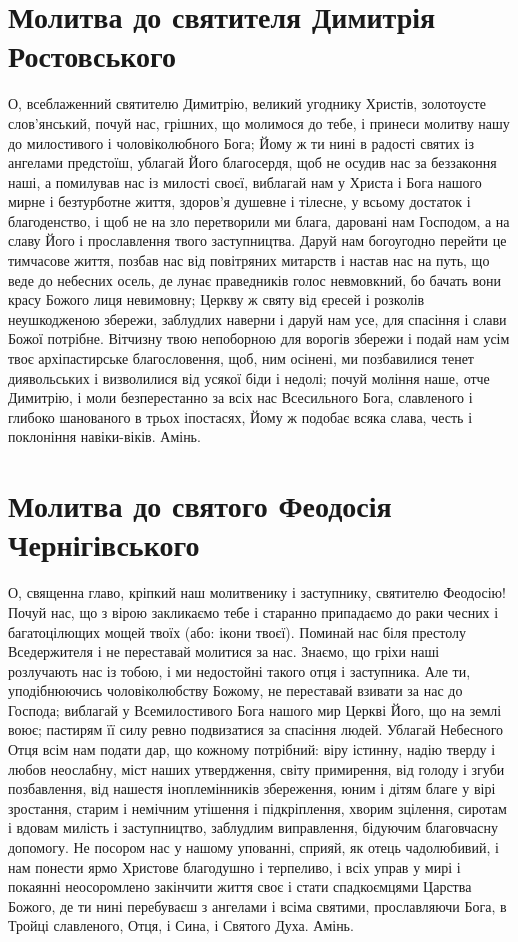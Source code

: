 \documentclass[chapters.tex]{subfiles}
\begin{document}
\section{Молитва до святителя Димитрія Ростовського}
О, всеблаженний святителю Димитрію, великий угоднику Христів, золотоусте слов’янський, почуй нас, грішних, що молимося до тебе, і принеси молитву нашу до милостивого і чоловіколюбного Бога; Йому ж ти нині в радості святих із ангелами предстоїш, ублагай Його благосердя, щоб не осудив нас за беззаконня наші, а помилував нас із милості своєї, виблагай нам у Христа і Бога нашого мирне і безтурботне життя, здоров’я душевне і тілесне, у всьому достаток і благоденство, і щоб не на зло перетворили ми блага, даровані нам Господом, а на славу Його і прославлення твого заступництва. Даруй нам богоугодно перейти це тимчасове життя, позбав нас від повітряних митарств і настав нас на путь, що веде до небесних осель, де лунає праведників голос невмовкний, бо бачать вони красу Божого лиця невимовну; Церкву ж святу від єресей і розколів неушкодженою збережи, заблудлих наверни і даруй нам усе, для спасіння і слави Божої потрібне. Вітчизну твою непоборною для ворогів збережи і подай нам усім твоє архіпастирське благословення, щоб, ним осінені, ми позбавилися тенет диявольських і визволилися від усякої біди і недолі; почуй моління наше, отче Димитрію, і моли безперестанно за всіх нас Всесильного Бога, славленого і глибоко шанованого в трьох іпостасях, Йому ж подобає всяка слава, честь і поклоніння навіки-віків. Амінь.

\section{Молитва до святого Феодосія Чернігівського}
О, священна главо, кріпкий наш молитвенику і заступнику, святителю Феодосію! Почуй нас, що з вірою закликаємо тебе і старанно припадаємо до раки чесних і багатоцілющих мощей твоїх (або: ікони твоєї). Поминай нас біля престолу Вседержителя і не переставай молитися за нас. Знаємо, що гріхи наші розлучають нас із тобою, і ми недостойні такого отця і заступника. Але ти, уподібнюючись чоловіколюбству Божому, не переставай взивати за нас до Господа; виблагай у Всемилостивого Бога нашого мир Церкві Його, що на землі воює; пастирям її силу ревно подвизатися за спасіння людей. Ублагай Небесного Отця всім нам подати дар, що кожному потрібний: віру істинну, надію тверду і любов неослабну, міст наших утвердження, світу примирення, від голоду і згуби позбавлення, від нашестя іноплемінників збереження, юним і дітям благе у вірі зростання, старим і немічним утішення і підкріплення, хворим зцілення, сиротам і вдовам милість і заступництво, заблудлим виправлення, бідуючим благовчасну допомогу. Не посором нас у нашому упованні, сприяй, як отець чадолюбивий, і нам понести ярмо Христове благодушно і терпеливо, і всіх управ у мирі і покаянні неосоромлено закінчити життя своє і стати спадкоємцями Царства Божого, де ти нині перебуваєш з ангелами і всіма святими, прославляючи Бога, в Тройці славленого, Отця, і Сина, і Святого Духа. Амінь.
\end{document}
